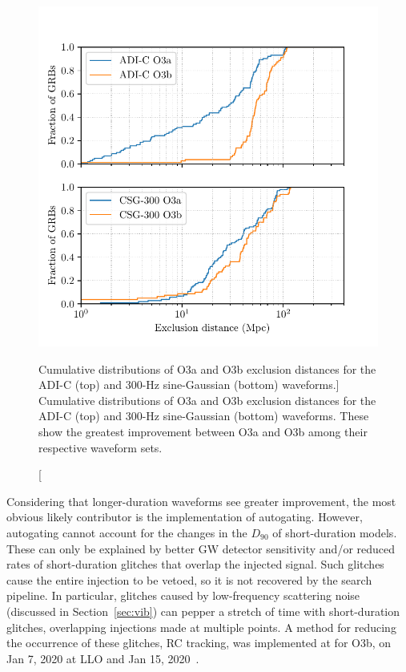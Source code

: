 \begin{figure}[h]
  \centering
  \includegraphics{figures/grb/compare-o3a.pdf}
  \caption
	[Cumulative distributions of O3a and O3b exclusion distances for the ADI-C (top) and 300-Hz sine-Gaussian (bottom) waveforms.]
	{Cumulative distributions of O3a and O3b exclusion distances for the ADI-C (top) and 300-Hz sine-Gaussian (bottom) waveforms.
	These show the greatest improvement between O3a and O3b among their respective waveform sets.}
  \label{fig:grb-o3b-compare-o3a}
\end{figure}

Considering that longer-duration waveforms see greater improvement, the most obvious likely contributor is the implementation of autogating.
However, autogating cannot account for the changes in the $D_{90}$ of short-duration models.
These can only be explained by better GW detector sensitivity and/or reduced rates of short-duration glitches that overlap the injected signal.
Such glitches cause the entire injection to be vetoed, so it is not recovered by the search pipeline.
In particular, glitches caused by low-frequency scattering noise (discussed in Section~\ref{sec:vib}) can pepper a stretch of time with short-duration glitches, overlapping injections made at multiple points.
A method for reducing the occurrence of these glitches, \ac{RC} tracking, was implemented at for O3b, on Jan 7, 2020 at \ac{LLO} and Jan 15, 2020~\citep{Soni_2020}.

